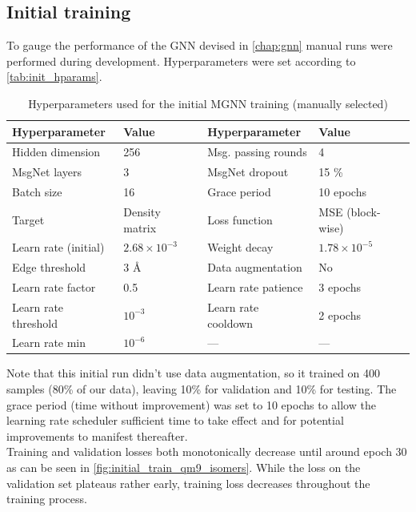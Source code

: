\subsection{Initial training}
\label{subsec:qm9_isomers_initial}
To gauge the performance of the GNN devised in \autoref{chap:gnn} manual runs were performed during development. Hyperparameters were set according to \autoref{tab:init_hparams}. 
\begin{table}[H]
    \centering
    \caption[Hyperparameters - initial MGNN training (manually selected)]{Hyperparameters used for the initial MGNN training (manually selected)}
    \label{tab:init_hparams}
    \begin{tabular}{ll ll}
        \toprule
        \textbf{Hyperparameter} & \textbf{Value} & \textbf{Hyperparameter} & \textbf{Value} \\
        \midrule
        Hidden dimension & 256 & Msg. passing rounds & 4 \\
        MsgNet layers & 3 & MsgNet dropout & 15 \% \\
        Batch size & 16 & Grace period & 10 epochs \\
        Target & Density matrix & Loss function & MSE (block-wise) \\
        Learn rate (initial) & $2.68 \times 10^{-3}$ & Weight decay & $1.78 \times 10^{-5}$ \\
        Edge threshold & 3 \AA & Data augmentation & No \\
        \midrule
        Learn rate factor & 0.5 & Learn rate patience & 3 epochs \\
        Learn rate threshold & $10^{-3}$ & Learn rate cooldown & 2 epochs \\
        Learn rate min & $10^{-6}$ & — & — \\
        \bottomrule
    \end{tabular}
\end{table}
Note that this initial run didn't use data augmentation, so it trained on 400 samples (80\% of our data), leaving 10\% for validation and 10\% for testing. The grace period (time without improvement) was set to 10 epochs to allow the learning rate scheduler sufficient time to take effect and for potential improvements to manifest thereafter.\\
Training and validation losses both monotonically decrease until around epoch 30 as can be seen in \autoref{fig:initial_train_qm9_isomers}. While the loss on the validation set plateaus rather early, training loss decreases throughout the training process. 
